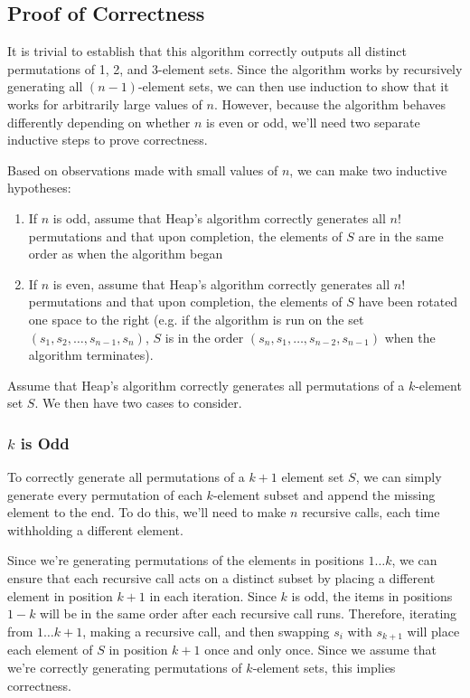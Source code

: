 \documentclass[10pt, oneside]{article}   	%
\begin{document}
\subsection{Proof of Correctness}

It is trivial to establish that this algorithm correctly outputs all distinct permutations of 1, 2, and 3-element sets. Since the algorithm works by recursively generating all $(n - 1)$-element sets, we can then use induction to show that it works for arbitrarily large values of $n$. However, because the algorithm behaves differently depending on whether $n$ is even or odd, we'll need two separate inductive steps to prove correctness.

Based on observations made with small values of $n$, we can make two inductive hypotheses:
\begin{enumerate}
	\item If $n$ is odd, assume that Heap's algorithm correctly generates all $n!$ permutations and that upon completion, the elements of $S$ are in the same order as when the algorithm began
	\item If $n$ is even, assume that Heap's algorithm correctly generates all $n!$ permutations and that upon completion, the elements of $S$ have been rotated one space to the right (e.g. if the algorithm is run on the set $(s_{1}, s_{2}, \dots, s_{n - 1}, s_{n})$, $S$ is in the order $(s_{n}, s_{1}, \dots, s_{n - 2}, s_{n - 1})$ when the algorithm terminates).
\end{enumerate}

Assume that Heap's algorithm correctly generates all permutations of a $k$-element set $S$. We then have two cases to consider.

\subsubsection{$k$ is Odd}

To correctly generate all permutations of a $k + 1$ element set $S$, we can simply generate every permutation of each $k$-element subset and append the missing element to the end. To do this, we'll need to make $n$ recursive calls, each time withholding a different element.

Since we're generating permutations of the elements in positions $1 \dots k$, we can ensure that each recursive call acts on a distinct subset by placing a different element in position $k + 1$ in each iteration. Since $k$ is odd, the items in positions $1 - k$ will be in the same order after each recursive call runs. Therefore, iterating from $1 \dots k + 1$, making a recursive call, and then swapping $s_{i}$ with $s_{k + 1}$ will place each element of $S$ in position $k + 1$ once and only once. Since we assume that we're correctly generating permutations of $k$-element sets, this implies correctness.
\end{document}
